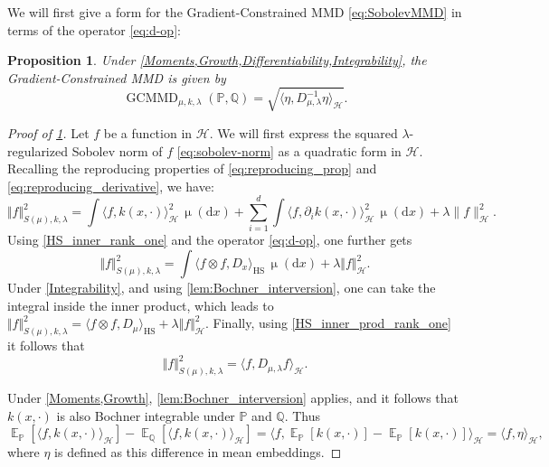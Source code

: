 \documentclass{article}
\newcommand{\ud}{\mathrm d}
\newcommand{\dx}{\ud x}
\newcommand{\mudx}{\operatorname{\mu}(\dx)}
\DeclareMathOperator{\E}{\mathbb E}
\newcommand{\h}{\mathcal H}
\newcommand{\hs}{\mathrm{HS}}
\newcommand{\PP}{\mathbb P}
\newcommand{\QQ}{\mathbb Q}
\DeclareMathOperator{\GCMMD}{GCMMD}
\newtheorem{prop}[lem]{Proposition}
\begin{document}
We will first give a form for the Gradient-Constrained MMD \eqref{eq:SobolevMMD}
in terms of the operator \eqref{eq:d-op}:
\begin{prop} \label{prop:dot_prod_expression}
Under \cref{Moments,Growth,Differentiability,Integrability},
the Gradient-Constrained MMD is given by
 \begin{equation}
   \GCMMD_{\mu,k,\lambda}(\PP, \QQ)
   = \sqrt{\langle\eta, D_{\mu,\lambda}^{-1} \eta \rangle_{\h}}
   \label{eq:GCMMD_operator_form}
 .\end{equation}
\end{prop}
\begin{proof}[Proof of \cref{prop:dot_prod_expression}]
Let $f$ be a function in $\h$.
We will first express the squared $\lambda$-regularized Sobolev norm of $f$
\eqref{eq:sobolev-norm}
as a quadratic form in $\h$.
Recalling the reproducing properties
of \eqref{eq:reproducing_prop} and \eqref{eq:reproducing_derivative},
we have:
\[
  \Vert f\Vert_{S(\mu),k,\lambda}^{2}
  = \int\langle f,k(x, \cdot)\rangle_{\h}^{2} \, \mudx
  + \sum_{i=1}^{d} \int\langle f, \partial_{i} k(x,\cdot) \rangle_{\h}^{2} \, \mudx
  + \lambda \lVert f \rVert_{\h}^{2}
.\]
Using \cref{HS_inner_rank_one} and the operator \eqref{eq:d-op}, one further gets
\[
  \Vert f\Vert_{S(\mu),k,\lambda}^{2}
  = \int\langle f \otimes f, D_x \rangle_\hs \, \mudx + \lambda \Vert f\Vert_{\h}^{2}
.\]
Under \cref{Integrability}, and using \cref{lem:Bochner_interversion},
one can take the integral inside the inner product, which leads to
$\Vert f\Vert_{S(\mu),k,\lambda}^{2} = \langle f\otimes f,D_\mu\rangle_\hs + \lambda\Vert f\Vert_{\h}^{2}$.
Finally, using \cref{HS_inner_prod_rank_one} it follows that
\[ \Vert f\Vert_{S(\mu),k,\lambda}^{2}=\langle f,D_{\mu,\lambda}f\rangle_{\h} .\]

Under \cref{Moments,Growth}, \cref{lem:Bochner_interversion} applies,
and it follows that $k(x, \cdot)$ is also Bochner integrable under $\PP$ and $\QQ$.
Thus
\[
    \E_\PP\left[ \langle f, k(x, \cdot)\rangle_{\h}\right]
  - \E_\QQ\left[ \langle f, k(x, \cdot)\rangle_{\h}\right]
  = \langle f, \E_\PP\left[ k(x, \cdot) \right] - \E_\PP\left[k(x, \cdot)\right] \rangle_{\h}
  = \langle f, \eta \rangle_{\h}
,\]
where $\eta$ is defined as this difference in mean embeddings.


\end{proof}
\end{document}
